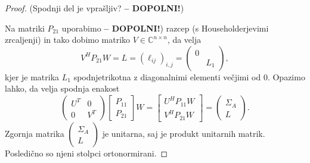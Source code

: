 \documentclass[mat1]{article}
\begin{document}
\begin{proof}
(Spodnji del je vprašljiv? \textbf{-- DOPOLNI!})

Na matriki $P_{21}$ uporabimo \textbf{-- DOPOLNI!}) razcep (s Householderjevimi zrcaljenji) in tako dobimo matriko $V \in \mathbb{C}^{n \times n}$, da velja $$ V^H P_{21} W = L = (\ell_{ij})_{i, j} =
\begin{pmatrix} 
0 &  \\
& L_1
\end{pmatrix}
,$$ kjer je matrika $L_1$ spodnjetrikotna z diagonalnimi elementi večjimi od $0$.
Opazimo lahko, da velja spodnja enakost
$$
\begin{pmatrix} 
U^T & 0 \\
0 & V^T
\end{pmatrix}
\begin{bmatrix}
P_{11} \\
P_{21}
\end{bmatrix} W = 
\begin{bmatrix}
U^H P_{11} W \\
V^H P_{21} W
\end{bmatrix} =
\begin{pmatrix}
\Sigma_A \\
L
\end{pmatrix}.
$$
Zgornja matrika $\begin{pmatrix}
\Sigma_A \\
L
\end{pmatrix}$ je unitarna, saj je produkt unitarnih matrik. Posledično so njeni stolpci ortonormirani.
\end{proof}


\end{document}
